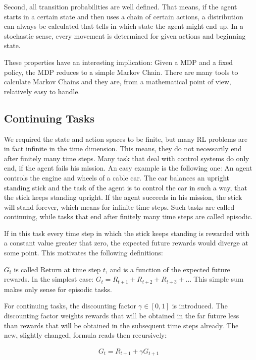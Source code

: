 \documentclass[paper=a4, fontsize=11pt]{scrartcl} %
\numberwithin{equation}{section} %
\numberwithin{figure}{section} %
\numberwithin{table}{section} %
\begin{document}
	Second, all transition probabilities are well defined. That means, if the agent starts in a certain state and then uses a chain of certain actions, a distribution can always be calculated that tells in which state the agent might end up. In a stochastic sense, every movement is determined for given actions and beginning state. 

	These properties have an interesting implication: Given a MDP and a fixed policy, the MDP reduces to a simple Markov Chain. There are many tools to calculate Markov Chains and they are, from a mathematical point of view, relatively easy to handle. 


\subsection{Continuing Tasks}

	We required the state and action spaces to be finite, but many RL problems are in fact infinite in the time dimension. This means, they do not necessarily end after finitely many time steps. Many task that deal with control systems do only end, if the agent fails his mission. An easy example is the following one: An agent controls the engine and wheels of a cable car. The car balances an upright standing stick and the task of the agent is to control the car in such a way, that the stick keeps standing upright. If the agent succeeds in his mission, the stick will stand forever, which means for infinite time steps. Such tasks are called continuing, while tasks that end after finitely many time steps are called episodic. 

	If in this task every time step in which the stick keeps standing is rewarded with a constant value greater that zero, the expected future rewards would diverge at some point. This motivates the following definitions:

	$G_t$ is called Return at time step $t$, and is a function of the expected future rewards. In the simplest case: $G_t = R_{t+1} + R_{t+2} + R_{t+3} + ...$ This simple sum makes only sense for episodic tasks.

	For continuing tasks, the discounting factor $\gamma \in [0,1]$ is introduced. The discounting factor weights rewards that will be obtained in the far future less than rewards that will be obtained in the subsequent time steps already. The new, slightly changed, formula reads then recursively: 

\begin{align}
G_t = R_{t+1} + \gamma G_{t+1}
\end{align}
\end{document}
